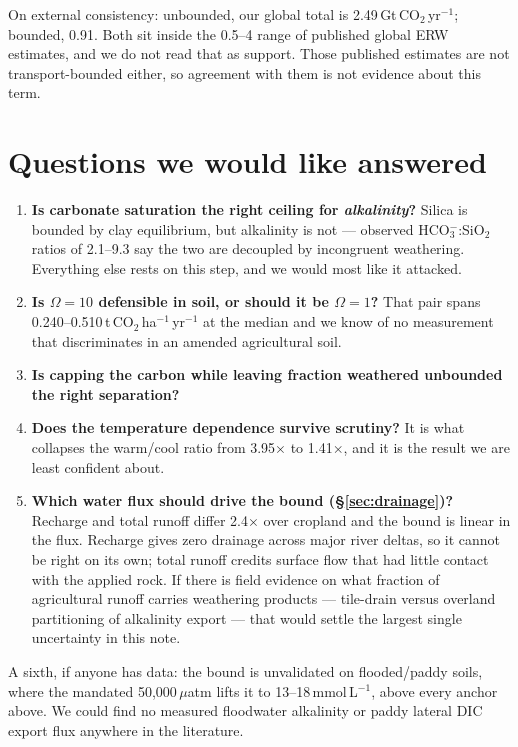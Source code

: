 \documentclass[11pt,a4paper]{article}
\newcommand{\hco}{HCO$_3^-$}
\newcommand{\cotwo}{CO$_2$}
\begin{document}
On external consistency: unbounded, our global total is
2.49\,Gt\,\cotwo{}\,yr$^{-1}$; bounded, 0.91. Both sit inside the 0.5--4
range of published global ERW estimates, and we do not read that as support. Those
published estimates are not transport-bounded either, so agreement with them is not
evidence about this term.

\section{Questions we would like answered}
\label{sec:questions}

\begin{enumerate}
\item \textbf{Is carbonate saturation the right ceiling for \emph{alkalinity}?} Silica
is bounded by clay equilibrium, but alkalinity is not --- observed
\hco{}:SiO$_2$ ratios of 2.1--9.3 say the two are decoupled by incongruent
weathering. Everything else rests on this step, and we would most like it attacked.
\item \textbf{Is $\Omega = 10$ defensible in soil, or should it be $\Omega = 1$?} That
pair spans 0.240--0.510\,t\,\cotwo{}\,ha$^{-1}$\,yr$^{-1}$ at the median and we
know of no measurement that discriminates in an amended agricultural soil.
\item \textbf{Is capping the carbon while leaving fraction weathered unbounded the
right separation?}
\item \textbf{Does the temperature dependence survive scrutiny?} It is what collapses
the warm/cool ratio from 3.95$\times$ to 1.41$\times$, and it is the result
we are least confident about.
\item \textbf{Which water flux should drive the bound (\S\ref{sec:drainage})?}
Recharge and total runoff differ 2.4$\times$ over cropland and the bound is linear in
the flux. Recharge gives zero drainage across major river deltas, so it cannot be
right on its own; total runoff credits surface flow that had little contact with the
applied rock. If there is field evidence on what fraction of agricultural runoff
carries weathering products --- tile-drain versus overland partitioning of alkalinity
export --- that would settle the largest single uncertainty in this note.
\end{enumerate}

A sixth, if anyone has data: the bound is unvalidated on flooded/paddy soils, where
the mandated 50{,}000\,$\mu$atm lifts it to 13--18\,mmol\,L$^{-1}$, above every
anchor above. We could find no measured floodwater alkalinity or paddy lateral DIC
export flux anywhere in the literature.
\end{document}
